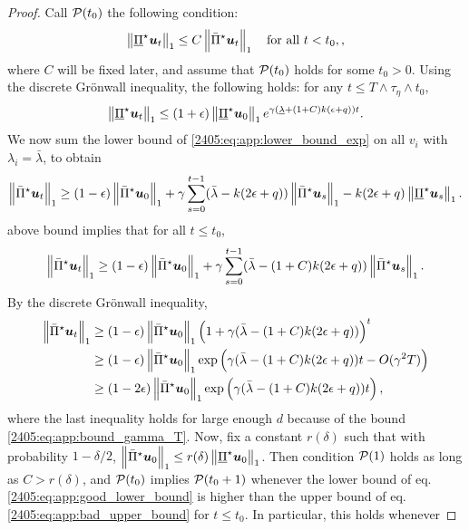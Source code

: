 \begin{proof}
  Call $\mathcal{P}(t_0)$ the following condition:
  \begin{equation}\label{2405:eq:app:rec_condition}
      \left\lVert \underline\Pi^\star {\boldsymbol{u}}_t\right\rVert_1 \leq C\left\lVert \bar\Pi^\star {\boldsymbol{u}}_t\right\rVert_1 \quad \text{for all} \  t < t_0, ,
  \end{equation} where $C$ will be fixed later, and assume that $\mathcal{P}(t_0)$ holds for some $t_0 > 0$.
  Using the discrete Grönwall inequality, the following holds: for any $t \leq T \wedge \tau_\eta \wedge t_0$,
  \begin{equation}\label{2405:eq:app:bad_upper_bound}
      \left\lVert \underline\Pi^\star {\boldsymbol{u}}_t\right\rVert_1 \leq (1 + \epsilon)\left\lVert \underline\Pi^\star {\boldsymbol{u}}_0\right\rVert_1 e^{\gamma (\underline\lambda + (1+C)k(\epsilon + q))t}.
  \end{equation} 
   We now sum the lower bound of \eqref{2405:eq:app:lower_bound_exp} on all $v_i$ with $\lambda_i = \bar\lambda$, to obtain
    \[ \left\lVert \bar\Pi^\star{\boldsymbol{u}}_t\right\rVert_1 \geq (1 - \epsilon) \left\lVert \bar\Pi^\star {\boldsymbol{u}}_0\right\rVert_1 + \gamma \sum_{s=0}^{t-1} (\bar\lambda - k(2\epsilon + q)) \left\lVert \bar\Pi^\star {\boldsymbol{u}}_s\right\rVert_1 - k(2\epsilon + q)\left\lVert \underline\Pi^\star {\boldsymbol{u}}_s\right\rVert_1. \]
      above bound implies that for all $t \leq t_0$,
     \[ \left\lVert \bar\Pi^\star{\boldsymbol{u}}_t\right\rVert_1 \geq (1 - \epsilon) \left\lVert \bar\Pi^\star {\boldsymbol{u}}_0\right\rVert_1 + \gamma \sum_{s=0}^{t-1} (\bar\lambda - (1+C)k(2\epsilon + q)) \left\lVert \bar\Pi^\star {\boldsymbol{u}}_s\right\rVert_1. \]
     By the discrete Grönwall inequality,
     \begin{align} 
        \left\lVert \bar\Pi^\star{\boldsymbol{u}}_t\right\rVert_1 &\geq (1 - \epsilon) \left\lVert \bar\Pi^\star {\boldsymbol{u}}_0\right\rVert_1 \left(1 +  \gamma(\bar\lambda - (1+C)k(2\epsilon + q)) \right)^t \nonumber\\ 
        &\geq (1 - \epsilon) \left\lVert \bar\Pi^\star {\boldsymbol{u}}_0\right\rVert_1 \exp\left(\gamma(\bar\lambda - (1+C)k(2\epsilon + q))t - O(\gamma^2 T) \right) \nonumber\\
        &\geq (1 - 2\epsilon) \left\lVert \bar\Pi^\star {\boldsymbol{u}}_0\right\rVert_1 \exp\left(\gamma(\bar\lambda - (1+C)k(2\epsilon + q))t\right), \label{2405:eq:app:good_lower_bound}
     \end{align}
     where the last inequality holds for large enough $d$ because of the bound \eqref{2405:eq:app:bound_gamma_T}.
     Now, fix a constant $r(\delta)$ such that with probability $1 - \delta/2$, $\left\lVert \bar\Pi^\star {\boldsymbol{u}}_0\right\rVert_1 \leq r(\delta)\left\lVert \underline\Pi^\star {\boldsymbol{u}}_0\right\rVert_1$. Then condition $\mathcal{P}(1)$ holds as long as $C > r(\delta)$, and $\mathcal{P}(t_0)$ implies $\mathcal{P}(t_0+1)$ whenever the lower bound of eq. \eqref{2405:eq:app:good_lower_bound} is higher than the upper bound of eq. \eqref{2405:eq:app:bad_upper_bound} for $t \leq t_0$. In particular, this holds whenever

\end{proof}
